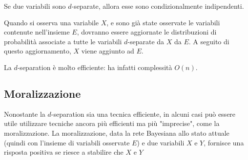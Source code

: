 \begin{examples}

\end{examples}

\begin{thm}
Se due variabili sono $d$-separate, allora esse sono condizionalmente indipendenti.
\end{thm}

Quando si osserva una variabile $X$, e sono già state osservate le variabili
contenute nell'insieme $E$, dovranno essere aggiornate le distribuzioni
di probabilità associate a tutte le variabili $d$-separate da $X$ da $E$.
A seguito di questo aggiornamento, $X$ viene aggiunto ad $E$.

La $d$-separation è molto efficiente: ha infatti complessità $O(n)$.

\subsection{Moralizzazione}
Nonostante la $d$-separation sia una tecnica efficiente, in alcuni casi
può essere utile utilizzare tecniche ancora più efficienti ma più "imprecise",
come la moralizzazione.
La moralizzazione, data la rete Bayesiana allo stato attuale (quindi con
l'insieme di variabili osservate $E$) e due variabili $X$ e $Y$, fornisce
una risposta positiva se riesce a stabilire che $X$ e $Y$
